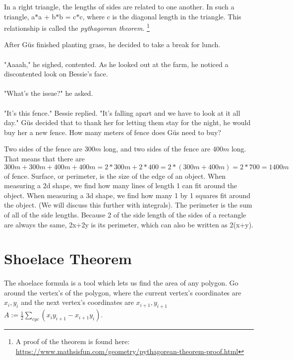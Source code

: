 {In a right triangle, the lengths of sides are related to one another. In such a triangle, a$\ast$a + b$\ast$b = c$\ast$c, where c is the diagonal length in the triangle. This relationship is called the \textit{pythagorean theorem}. \footnote{A proof of the theorem is found here: \url{https://www.mathsisfun.com/geometry/pythagorean-theorem-proof.html}}}
{}
{After G{\"u}s finished planting grass, he decided to take a break for lunch. \paragraph{} "Aaaah," he sighed, contented. As he looked out at the farm, he noticed a discontented look on Bessie's face. \paragraph{}"What's the issue?" he asked. \paragraph{} "It's this fence." Bessie replied. "It's falling apart and we have to look at it all day." G{\"u}s decided that to thank her for letting them stay for the night, he would buy her a new fence. How many meters of fence does G{\"u}s need to buy?}
{Two sides of the fence are $300 m$ long, and two sides of the fence are $400 m$ long. That means that there are $300 m + 300 m + 400 m + 400 m = 2\ast 300 m+ 2\ast 400 = 2\ast(300 m + 400m) = 2\ast 700 = 1400 m$ of fence.}
{Surface, or perimeter, is the size of the edge of an object. When measuring a 2d shape, we find how many lines of length 1 can fit around the object. When measuring a 3d shape, we find how many 1 by 1 squares fit around the object. (We will discuss this further with integrals).
The perimeter is the sum of all of the side lengths. Because 2 of the side length of the sides of a rectangle are always the same, 2x+2y is its perimeter, which can also be written as 2(x+y).}
{}
\section{Shoelace Theorem}
\paragraph{} The shoelace formula is a tool which lets us find the area of any polygon. Go around the vertex's of the polygon, where the current vertex's coordinates are $x_i, y_i$ and the next vertex's coordinates are $x_{i+1}, y_{i+1}$ \linebreak
$A:={\frac{1}{2}}\sum_{cyc} (x_iy_{i+1}-x_{i+1}y_i)$.